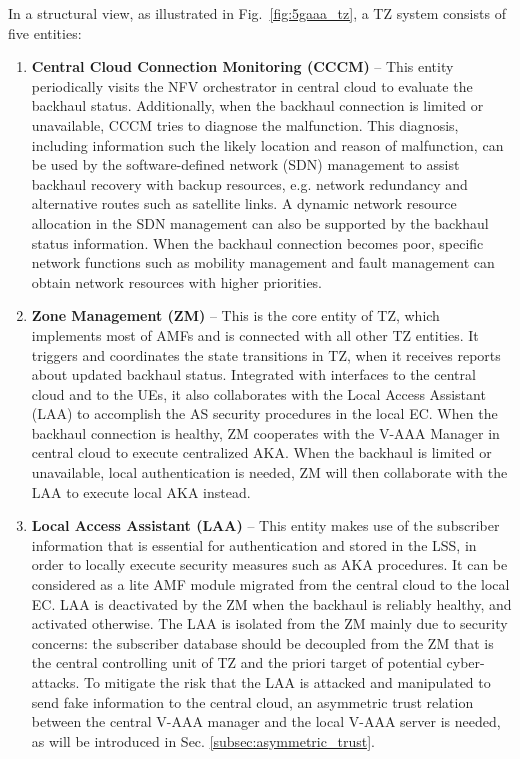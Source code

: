 \documentclass{ieeeaccess}
\newcommand{\change}[1]{#1}
\begin{document}
	In a structural view, as illustrated in Fig.~\ref{fig:5gaaa_tz}, a TZ system consists of five entities: 
	\begin{enumerate}
		\item \textbf{Central Cloud Connection Monitoring (CCCM)} --
		This entity periodically visits the NFV orchestrator in central cloud to evaluate the backhaul status. Additionally, when the backhaul connection is limited or unavailable, CCCM tries to diagnose the malfunction. This \change{diagnosis, including information such the likely location and reason of malfunction,} can be used by the software-defined network (SDN) management to assist backhaul recovery with backup resources, e.g. network redundancy and alternative routes such as satellite links. A dynamic network resource allocation in the SDN management can also be supported by the backhaul status information. When the backhaul connection becomes poor, specific network functions such as mobility management and fault management can obtain network resources with higher priorities.
		\item \textbf{Zone Management (ZM)} --
		This is the core entity of TZ, which implements \change{most of AMFs} and is connected with all other TZ entities. It triggers and coordinates the state transitions in TZ, when it receives reports about updated backhaul status. Integrated with interfaces to the central cloud and to the UEs, it also collaborates with the Local Access Assistant (LAA) to accomplish the AS security procedures in the local EC. When the backhaul connection is healthy, ZM cooperates with the V-AAA Manager in central cloud to execute centralized AKA. When the backhaul is limited or unavailable, local authentication is needed, ZM will then collaborate with the LAA to execute local AKA instead. 
		\item \textbf{Local Access Assistant (LAA)} --
		This entity makes use of the subscriber information that is essential for authentication and stored in the LSS, in order to locally execute security measures such as AKA procedures. It can be considered as a lite AMF module migrated from the central cloud to the local EC. LAA is deactivated by the ZM when the backhaul is reliably healthy, and activated otherwise. The LAA is isolated from the ZM mainly due to security concerns: the subscriber database should be decoupled from the ZM that is the central controlling unit of TZ and the priori target of potential cyber-attacks. To mitigate the risk that the LAA is attacked and manipulated to send fake information to the central cloud, an asymmetric trust relation between the central V-AAA manager and the local V-AAA server is needed, as will be introduced in Sec. \ref{subsec:asymmetric_trust}. %

\end{enumerate}
\end{document}
